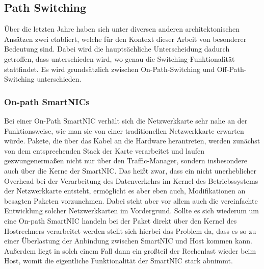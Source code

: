 \subsection{Path Switching}
Über die letzten Jahre haben sich unter diversen anderen architektonischen Ansätzen zwei etabliert, welche für den Kontext dieser Arbeit von besonderer Bedeutung sind. Dabei wird die hauptsächliche Unterscheidung dadurch getroffen, dass unterschieden wird, wo genau die Switching-Funktionalität stattfindet. Es wird grundsätzlich zwischen On-Path-Switching und Off-Path-Switching unterschieden.
\subsubsection{On-path SmartNICs}
Bei einer On-Path SmartNIC verhält sich die Netzwerkkarte sehr nahe an der Funktionsweise, wie man sie von einer traditionellen Netzwerkkarte erwarten würde. Pakete, die über das Kabel an die Hardware herantreten, werden zunächst von dem entsprechenden Stack der Karte verarbeitet und laufen gezwungenermaßen nicht nur über den Traffic-Manager, sondern insbesondere auch über die Kerne der SmartNIC. Das heißt zwar, dass ein nicht unerheblicher Overhead bei der Verarbeitung des Datenverkehrs im Kernel des Betriebssystems der Netzwerkkarte entsteht, ermöglicht es aber eben auch, Modifikationen an besagten Paketen vorzunehmen. Dabei steht aber vor allem auch die vereinfachte Entwicklung solcher Netzwerkkarten im Vordergrund. Sollte es sich wiederum um eine On-path SmartNIC handeln bei der Paket direkt über den Kernel des Hostrechners verarbeitet werden stellt sich hierbei das Problem da, dass es so zu einer Überlastung der Anbindung zwischen SmartNIC und Host kommen kann. Außerdem liegt in solch einem Fall dann ein großteil der Rechenlast wieder beim Host, womit die eigentliche Funktionalität der SmartNIC stark abnimmt. 
